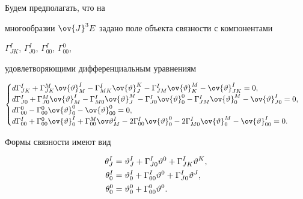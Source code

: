 Будем предполагать, что на


многообразии $\ov{J}^3E$ задано поле объекта связности с компонентами


$\Gamma^I_{JK}$, $\Gamma^I_{J0}$, $\Gamma^I_{00}$, $\Gamma^0_{00}$,


удовлетворяющими дифференциальным уравнениям


\begin{equation}


\begin{cases}


d\Gamma^I_{JK}+\Gamma^M_{JK}\ov{\vartheta}^I_M-


\Gamma^I_{MK}\ov{\vartheta}^K_J-\Gamma^I_{JM}\ov{\vartheta}^M_K-


\ov{\vartheta}^I_{JK}=0,\\


%


d\Gamma^I_{J0}+\Gamma^M_{J0}\ov{\vartheta}^I_M-


\Gamma^I_{M0}\ov{\vartheta}^M_J-\Gamma^I_{J0}\ov{\vartheta}^0_0-


\Gamma^I_{JM}\ov{\vartheta}^M_0-\ov{\vartheta}^I_{J0}=0, \\


%


d\Gamma^0_{00}-\Gamma^0_{00}\ov{\vartheta}^0_0-\ov{\vartheta}^0_{00}=0, \\


%


d\Gamma^I_{00}+\Gamma^0_{00}\ov{\vartheta}^I_0+


\Gamma^M_{00}\ov\vartheta^I_M-2\Gamma^I_{00}\ov{\vartheta}^0_0-


2\Gamma^I_{M0}\ov{\vartheta}^M_0-\ov{\vartheta}^I_{00}=0.


\end{cases}


\end{equation}


Формы связности имеют вид


\begin{align}


\theta^I_J&=\vartheta^I_J+\Gamma^I_{J0}\vartheta^0+


\Gamma^I_{JK}\vartheta^K, \notag \\


%


\theta^I_0&=\vartheta^I_0+\Gamma^I_{00}\vartheta^0+


\Gamma^I_{J0}\vartheta^J, \\


%


\theta^0_0&= \vartheta^0_0+\Gamma^0_{00}\vartheta^0. \notag


\end{align}





